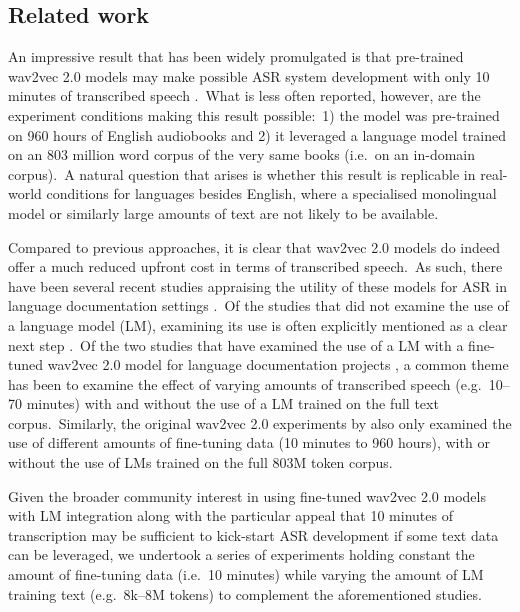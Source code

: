 \documentclass[main.tex]{subfiles}
\begin{document}
\subsection{Related work}

An impressive result that has been widely promulgated is that pre-trained wav2vec 2.0 models may make possible ASR system development with only 10 minutes of transcribed speech \parencite{NEURIPS2020_92d1e1eb}.~What is less often reported, however, are the experiment conditions making this result possible:~1) the model was pre-trained on 960 hours of English audiobooks and 2) it leveraged a language model trained on an 803 million word corpus of the very same books (i.e.~on an in-domain corpus).~A natural question that arises is whether this result is replicable in real-world conditions for languages besides English, where a specialised monolingual model or similarly large amounts of text are not likely to be available.

Compared to previous approaches, it is clear that wav2vec 2.0 models do indeed offer a much reduced upfront cost in terms of transcribed speech.~As such, there have been several recent studies appraising the utility of these models for ASR in language documentation settings \parencite[e.g.][]{coto-solano-etal-2022-development,guillaume2022fine,macaire-etal-2022-automatic,san-etal-2022-automated,zhang-etal-2022-nlp}.~Of the studies that did not examine the use of a language model (LM), examining its use is often explicitly mentioned as a clear next step \parencite[e.g.][p.~176]{guillaume2022fine}.~Of the two studies that have examined the use of a LM with a fine-tuned wav2vec 2.0 model for language documentation projects \parencite{macaire-etal-2022-automatic,san-etal-2022-automated}, a common theme has been to examine the effect of varying amounts of transcribed speech (e.g.~10--70 minutes) with and without the use of a LM trained on the full text corpus.~Similarly, the original wav2vec 2.0 experiments by \textcite{NEURIPS2020_92d1e1eb} also only examined the use of different amounts of fine-tuning data (10 minutes to 960 hours), with or without the use of LMs trained on the full 803M token corpus.

Given the broader community interest in using fine-tuned wav2vec 2.0 models with LM integration along with the particular appeal that 10 minutes of transcription may be sufficient to kick-start ASR development if some text data can be leveraged, we undertook a series of experiments holding constant the amount of fine-tuning data (i.e.~10 minutes) while varying the amount of LM training text (e.g.~8k--8M tokens) to complement the aforementioned studies.
\end{document}
